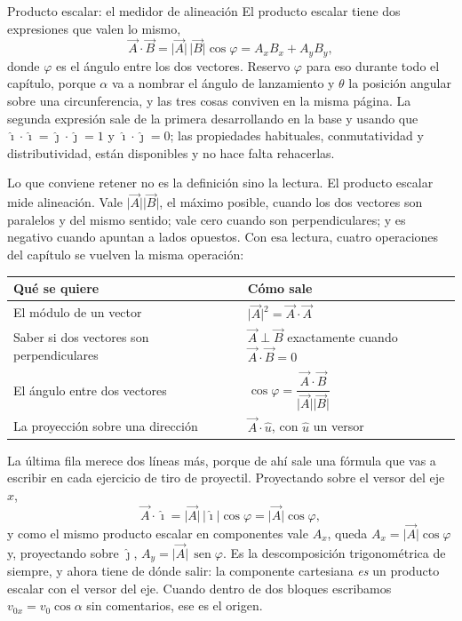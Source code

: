 \documentclass[11pt,openany]{book}
\newcommand{\sen}{\operatorname{sen}}
\begin{document}
\begin{bloque}{Producto escalar: el medidor de alineación}
El producto escalar tiene dos expresiones que valen lo mismo,
\[
\vec A \cdot \vec B = \lvert\vec A\rvert\,\lvert\vec B\rvert\cos\varphi = A_xB_x + A_yB_y,
\]
donde $\varphi$ es el ángulo entre los dos vectores. Reservo $\varphi$ para eso durante todo el capítulo, porque $\alpha$ va a nombrar el ángulo de lanzamiento y $\theta$ la posición angular sobre una circunferencia, y las tres cosas conviven en la misma página. La segunda expresión sale de la primera desarrollando en la base y usando que $\hat\imath\cdot\hat\imath = \hat\jmath\cdot\hat\jmath = 1$ y $\hat\imath\cdot\hat\jmath = 0$; las propiedades habituales, conmutatividad y distributividad, están disponibles y no hace falta rehacerlas.

Lo que conviene retener no es la definición sino la lectura. El producto escalar mide alineación. Vale $\lvert\vec A\rvert\lvert\vec B\rvert$, el máximo posible, cuando los dos vectores son paralelos y del mismo sentido; vale cero cuando son perpendiculares; y es negativo cuando apuntan a lados opuestos. Con esa lectura, cuatro operaciones del capítulo se vuelven la misma operación:

\begin{center}
\begin{tabular}{ll}
\toprule
Qué se quiere & Cómo sale \\
\midrule
El módulo de un vector & $\lvert\vec A\rvert^2 = \vec A\cdot\vec A$ \\
Saber si dos vectores son perpendiculares & $\vec A \perp \vec B$ exactamente cuando $\vec A\cdot\vec B = 0$ \\
El ángulo entre dos vectores & $\cos\varphi = \dfrac{\vec A\cdot\vec B}{\lvert\vec A\rvert\lvert\vec B\rvert}$ \\[6pt]
La proyección sobre una dirección & $\vec A\cdot\hat u$, con $\hat u$ un versor \\
\bottomrule
\end{tabular}
\end{center}

La última fila merece dos líneas más, porque de ahí sale una fórmula que vas a escribir en cada ejercicio de tiro de proyectil. Proyectando sobre el versor del eje $x$,
\[
\vec A\cdot\hat\imath = \lvert\vec A\rvert\,\lvert\hat\imath\rvert\cos\varphi = \lvert\vec A\rvert\cos\varphi,
\]
y como el mismo producto escalar en componentes vale $A_x$, queda $A_x = \lvert\vec A\rvert\cos\varphi$ y, proyectando sobre $\hat\jmath$, $A_y = \lvert\vec A\rvert\,\sen\varphi$. Es la descomposición trigonométrica de siempre, y ahora tiene de dónde salir: la componente cartesiana \emph{es} un producto escalar con el versor del eje. Cuando dentro de dos bloques escribamos $v_{0x} = v_0\cos\alpha$ sin comentarios, ese es el origen.


\end{bloque}
\end{document}
